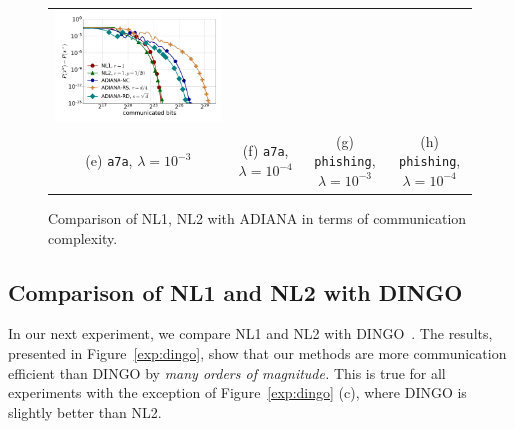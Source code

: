 \documentclass[12pt]{article}
\begin{document}
\begin{figure}[ht]
\begin{center}
{\begin{tabular}{cccc}
				\includegraphics[width = 0.23 \textwidth]{LogReg/phishing/Lambda=1e-4/phishing_nl1_nl2_adiana_lmb=0.0001.pdf}
				\\
				(e) {\tt a7a}, $\lambda=10^{-3}$ &(f) {\tt a7a}, $\lambda=10^{-4}$ & (g) {\tt phishing}, $\lambda=10^{-3}$ &(h) {\tt phishing}, $\lambda=10^{-4}$
		\end{tabular}}
		\caption{Comparison of {\sf NL1}, {\sf NL2} with ADIANA in terms of communication complexity.}
		\label{exp:adiana}
	\end{center}
\end{figure}







\subsection{Comparison of {\sf NL1} and {\sf NL2} with DINGO}

In our next experiment, we compare {\sf NL1} and {\sf NL2} with DINGO~\citep{DINGO2019}. The results, presented  in Figure~\ref{exp:dingo}, show that our methods are more communication efficient than DINGO  by {\em many orders of magnitude.}
This is true for all  experiments with the exception of Figure~\ref{exp:dingo} (c), where DINGO is slightly better than {\sf NL2}. 
\end{document}
